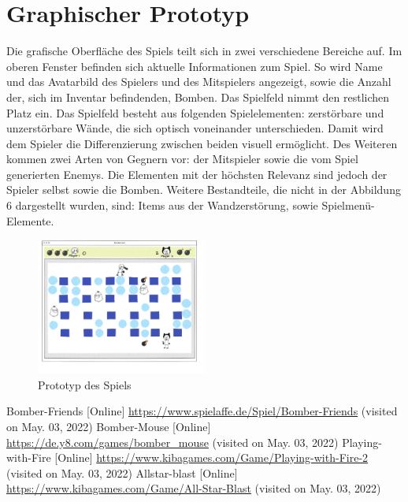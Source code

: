 \documentclass[conference]{IEEEtran}
\begin{document}
\section{Graphischer Prototyp}
Die grafische Oberfläche des Spiels teilt sich in zwei verschiedene Bereiche auf. Im oberen Fenster befinden sich aktuelle Informationen zum Spiel. So wird Name und das Avatarbild des Spielers und des Mitspielers angezeigt, sowie die Anzahl der, sich im Inventar befindenden, Bomben. Das Spielfeld nimmt den restlichen Platz ein. Das Spielfeld besteht aus folgenden Spielelementen: zerstörbare und unzerstörbare Wände, die sich optisch voneinander unterschieden. Damit wird dem Spieler die Differenzierung zwischen beiden visuell ermöglicht. Des Weiteren kommen zwei Arten von Gegnern vor: der Mitspieler sowie die vom Spiel generierten Enemys. Die Elementen mit der höchsten Relevanz sind jedoch der Spieler selbst sowie die Bomben. Weitere Bestandteile, die nicht in der Abbildung 6 dargestellt wurden, sind: Items aus der Wandzerstörung, sowie Spielmenü-Elemente. 
\begin{figure}[H]
    \centering
    \includegraphics[width=0.5\textwidth]{res/prototyp.png}
    \caption{Prototyp des Spiels}
\end{figure}

\begin{thebibliography}{0}
	Bomber-Friends [Online] \url{https://www.spielaffe.de/Spiel/Bomber-Friends} (visited on May. 03, 2022)
	Bomber-Mouse [Online] \url{https://de.y8.com/games/bomber_mouse} (visited on May. 03, 2022)
	Playing-with-Fire [Online] \url{https://www.kibagames.com/Game/Playing-with-Fire-2 } (visited on May. 03, 2022)
	Allstar-blast [Online] \url{https://www.kibagames.com/Game/All-Star-Blast} (visited on May. 03, 2022)

\end{thebibliography}
\vspace{12pt}
\end{document}
